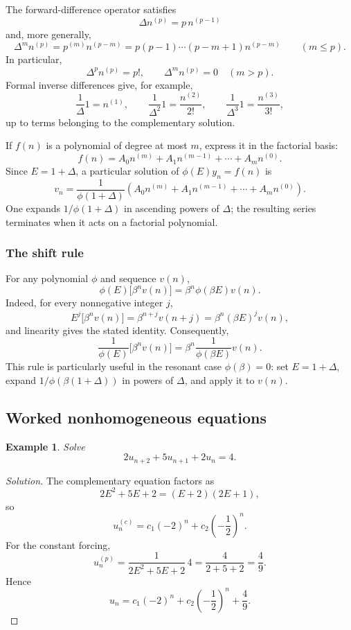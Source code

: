 \documentclass[11pt,a4paper]{article}
\numberwithin{equation}{section}
\theoremstyle{spacedplain}
\theoremstyle{spaceddefinition}
\newtheorem{example}[theorem]{Example}
\theoremstyle{spacedremark}
\begin{document}
The forward-difference operator satisfies
\[
  \Delta n^{(p)}=p\,n^{(p-1)}
\]
and, more generally,
\[
  \Delta^m n^{(p)}
  =p^{(m)}n^{(p-m)}
  =p(p-1)\cdots(p-m+1)n^{(p-m)}
  \qquad (m\le p).
\]
In particular,
\[
  \Delta^p n^{(p)}=p!,
  \qquad
  \Delta^m n^{(p)}=0\quad(m>p).
\]
Formal inverse differences give, for example,
\[
  \frac{1}{\Delta}1=n^{(1)},\qquad
  \frac{1}{\Delta^2}1=\frac{n^{(2)}}{2!},\qquad
  \frac{1}{\Delta^3}1=\frac{n^{(3)}}{3!},
\]
up to terms belonging to the complementary solution.

If \(f(n)\) is a polynomial of degree at most \(m\), express it in the
factorial basis:
\[
  f(n)=A_0n^{(m)}+A_1n^{(m-1)}+\cdots+A_mn^{(0)}.
\]
Since \(E=1+\Delta\), a particular solution of
\(\phi(E)y_n=f(n)\) is
\[
  v_n=
  \frac{1}{\phi(1+\Delta)}
  \left(
    A_0n^{(m)}+A_1n^{(m-1)}+\cdots+A_mn^{(0)}
  \right).
\]
One expands \(1/\phi(1+\Delta)\) in ascending powers of \(\Delta\);
the resulting series terminates when it acts on a factorial polynomial.

\subsubsection{The shift rule}

For any polynomial \(\phi\) and sequence \(v(n)\),
\[
  \boxed{
  \phi(E)\bigl[\beta^n v(n)\bigr]
  =\beta^n\phi(\beta E)v(n).}
\]
Indeed, for every nonnegative integer \(j\),
\[
  E^j\bigl[\beta^n v(n)\bigr]
  =\beta^{n+j}v(n+j)
  =\beta^n(\beta E)^jv(n),
\]
and linearity gives the stated identity.  Consequently,
\[
  \boxed{
  \frac{1}{\phi(E)}\bigl[\beta^n v(n)\bigr]
  =\beta^n\frac{1}{\phi(\beta E)}v(n).}
\]
This rule is particularly useful in the resonant case
\(\phi(\beta)=0\): set \(E=1+\Delta\), expand
\(1/\phi(\beta(1+\Delta))\) in powers of \(\Delta\), and apply it to
\(v(n)\).

\subsection{Worked nonhomogeneous equations}

\begin{example}
Solve
\[
  2u_{n+2}+5u_{n+1}+2u_n=4.
\]
\end{example}

\begin{proof}[Solution]
The complementary equation factors as
\[
  2E^2+5E+2=(E+2)(2E+1),
\]
so
\[
  u_n^{(c)}=c_1(-2)^n+c_2\left(-\frac12\right)^n.
\]
For the constant forcing,
\[
  u_n^{(p)}
  =\frac{1}{2E^2+5E+2}\,4
  =\frac{4}{2+5+2}
  =\frac49.
\]
Hence
\[
  \boxed{
  u_n=c_1(-2)^n+c_2\left(-\frac12\right)^n+\frac49.}
\]
\end{proof}
\end{document}
